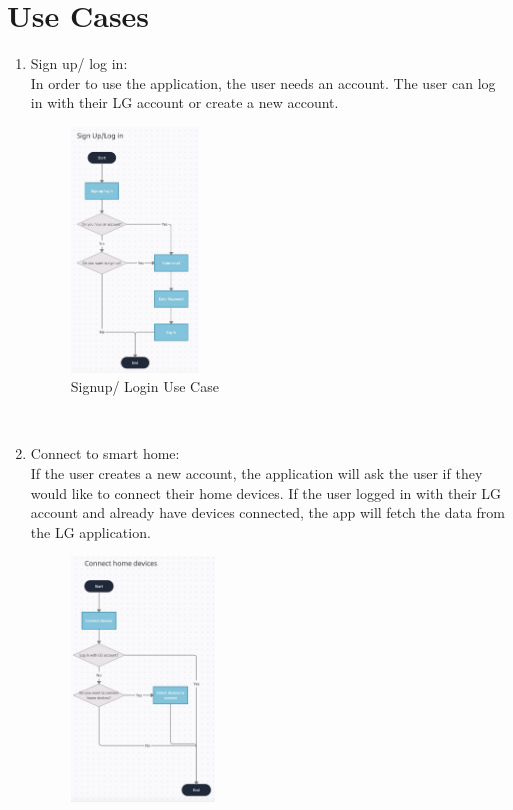 \documentclass[conference]{IEEEtran}
\begin{document}
\section{Use Cases}
\begin{enumerate}
    \item Sign up/ log in: \\
        In order to use the application, the user needs an account. The user can log in with their LG account or create a new account.
        \begin{figure}[htbp]
            \centerline{\includegraphics[height=65mm,scale=0.5]{Images/UseCase_Loggin.jpeg}}
            \caption{Signup/ Login Use Case}
            \label{fig}
        \end{figure} \\
    \item Connect to smart home: \\
       If the user creates a new account, the application will ask the user if they would like to connect their home devices. If the user logged in with their LG account and already have devices connected, the app will fetch the data from the LG application. 
        \begin{figure}[htbp]
            \centerline{\includegraphics[height=65mm,scale=0.5]{Images/UseCase_ConnectHome.jpeg}}

\end{figure}
\end{enumerate}
\end{document}
